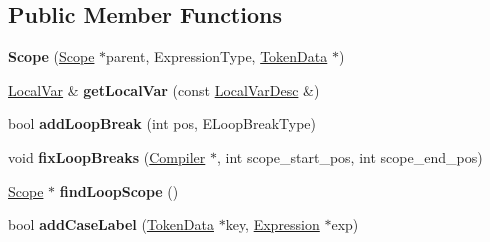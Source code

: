 \subsection*{Public Member Functions}
\begin{DoxyCompactItemize}
\item 
{\bfseries Scope} (\hyperlink{struct_object_script_1_1_o_s_1_1_core_1_1_compiler_1_1_scope}{Scope} $\ast$parent, Expression\+Type, \hyperlink{class_object_script_1_1_o_s_1_1_core_1_1_tokenizer_1_1_token_data}{Token\+Data} $\ast$)\hypertarget{struct_object_script_1_1_o_s_1_1_core_1_1_compiler_1_1_scope_a59a7affeb80172ebedc553a43599fecd}{}\label{struct_object_script_1_1_o_s_1_1_core_1_1_compiler_1_1_scope_a59a7affeb80172ebedc553a43599fecd}

\item 
\hyperlink{struct_object_script_1_1_o_s_1_1_core_1_1_compiler_1_1_scope_1_1_local_var}{Local\+Var} \& {\bfseries get\+Local\+Var} (const \hyperlink{struct_object_script_1_1_o_s_1_1_core_1_1_compiler_1_1_local_var_desc}{Local\+Var\+Desc} \&)\hypertarget{struct_object_script_1_1_o_s_1_1_core_1_1_compiler_1_1_scope_a425fe01850327ebc0ff1bdbd59d8360d}{}\label{struct_object_script_1_1_o_s_1_1_core_1_1_compiler_1_1_scope_a425fe01850327ebc0ff1bdbd59d8360d}

\item 
bool {\bfseries add\+Loop\+Break} (int pos, E\+Loop\+Break\+Type)\hypertarget{struct_object_script_1_1_o_s_1_1_core_1_1_compiler_1_1_scope_aeb4cd16060a642d0c44452b30c820948}{}\label{struct_object_script_1_1_o_s_1_1_core_1_1_compiler_1_1_scope_aeb4cd16060a642d0c44452b30c820948}

\item 
void {\bfseries fix\+Loop\+Breaks} (\hyperlink{class_object_script_1_1_o_s_1_1_core_1_1_compiler}{Compiler} $\ast$, int scope\+\_\+start\+\_\+pos, int scope\+\_\+end\+\_\+pos)\hypertarget{struct_object_script_1_1_o_s_1_1_core_1_1_compiler_1_1_scope_aeb5689168c0b77c8b92e384d06e15b55}{}\label{struct_object_script_1_1_o_s_1_1_core_1_1_compiler_1_1_scope_aeb5689168c0b77c8b92e384d06e15b55}

\item 
\hyperlink{struct_object_script_1_1_o_s_1_1_core_1_1_compiler_1_1_scope}{Scope} $\ast$ {\bfseries find\+Loop\+Scope} ()\hypertarget{struct_object_script_1_1_o_s_1_1_core_1_1_compiler_1_1_scope_aad8aca1ebbf235f9b82a86d331cbfe7f}{}\label{struct_object_script_1_1_o_s_1_1_core_1_1_compiler_1_1_scope_aad8aca1ebbf235f9b82a86d331cbfe7f}

\item 
bool {\bfseries add\+Case\+Label} (\hyperlink{class_object_script_1_1_o_s_1_1_core_1_1_tokenizer_1_1_token_data}{Token\+Data} $\ast$key, \hyperlink{struct_object_script_1_1_o_s_1_1_core_1_1_compiler_1_1_expression}{Expression} $\ast$exp)\hypertarget{struct_object_script_1_1_o_s_1_1_core_1_1_compiler_1_1_scope_a9a24fd87a8ff674573c0b19762ee7122}{}\label{struct_object_script_1_1_o_s_1_1_core_1_1_compiler_1_1_scope_a9a24fd87a8ff674573c0b19762ee7122}


\end{DoxyCompactItemize}
